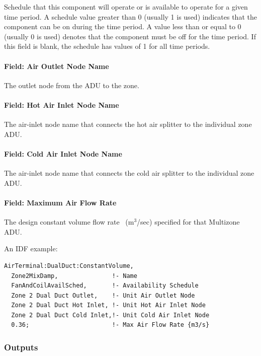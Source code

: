 Schedule that this component will operate or is available to operate for a given time period. A schedule value greater than 0 (usually 1 is used) indicates that the component can be on during the time period. A value less than or equal to 0 (usually 0 is used) denotes that the component must be off for the time period. If this field is blank, the schedule has values of 1 for all time periods.

\paragraph{Field: Air Outlet Node Name}\label{field-air-outlet-node-name-7}

The outlet node from the ADU to the zone.

\paragraph{Field: Hot Air Inlet Node Name}\label{field-hot-air-inlet-node-name}

The air-inlet node name that connects the hot air splitter to the individual zone ADU.

\paragraph{Field: Cold Air Inlet Node Name}\label{field-cold-air-inlet-node-name}

The air-inlet node name that connects the cold air splitter to the individual zone ADU.

\paragraph{Field: Maximum Air Flow Rate}\label{field-maximum-air-flow-rate-7}

The design constant volume flow rate~ (m\(^{3}\)/sec) specified for that Multizone ADU.

An IDF example:

\begin{lstlisting}
AirTerminal:DualDuct:ConstantVolume,
  Zone2MixDamp,               !- Name
  FanAndCoilAvailSched,       !- Availability Schedule
  Zone 2 Dual Duct Outlet,    !- Unit Air Outlet Node
  Zone 2 Dual Duct Hot Inlet, !- Unit Hot Air Inlet Node
  Zone 2 Dual Duct Cold Inlet,!- Unit Cold Air Inlet Node
  0.36;                       !- Max Air Flow Rate {m3/s}
\end{lstlisting}

\subsubsection{Outputs}\label{outputs-12}

